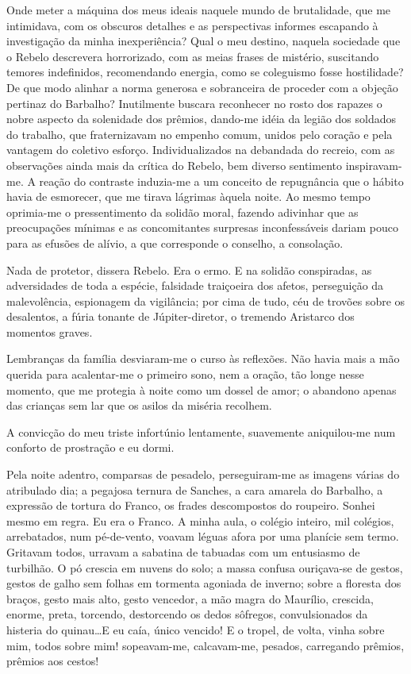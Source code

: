 Onde meter a máquina dos meus ideais naquele mundo de brutalidade, que me intimidava, 
com os obscuros detalhes e as perspectivas informes escapando à investigação da minha
inexperiência? Qual o meu destino, naquela sociedade que o Rebelo
descrevera horrorizado, com as meias frases de mistério, suscitando
temores indefinidos, recomendando energia, como se coleguismo fosse
hostilidade? De que modo alinhar a norma generosa e sobranceira de
proceder com a objeção pertinaz do Barbalho? Inutilmente buscara
reconhecer no rosto dos rapazes o nobre aspecto da solenidade dos
prêmios, dando{}-me idéia da legião dos soldados do trabalho, que
fraternizavam no empenho comum, unidos pelo coração e pela vantagem do
coletivo esforço. Individualizados na debandada do recreio, com as
observações ainda mais da crítica do Rebelo, bem diverso sentimento
inspiravam{}-me. A reação do contraste induzia{}-me a um conceito de
repugnância que o hábito havia de esmorecer, que me tirava lágrimas
àquela noite. Ao mesmo tempo oprimia{}-me o pressentimento da solidão
moral, fazendo adivinhar que as preocupações mínimas e as concomitantes
surpresas inconfessáveis dariam pouco para as efusões de alívio, a que
corresponde o conselho, a consolação. 

Nada de protetor, dissera Rebelo.
Era o ermo. E na solidão conspiradas, as adversidades de toda a
espécie, falsidade traiçoeira dos afetos, perseguição da malevolência,
espionagem da vigilância; por cima de tudo, céu de trovões sobre os
desalentos, a fúria tonante de Júpiter{}-diretor, o tremendo Aristarco
dos momentos graves. 

Lembranças da família desviaram{}-me o curso às
reflexões. Não havia mais a mão querida para acalentar{}-me o primeiro
sono, nem a oração, tão longe nesse momento, que me protegia à noite
como um dossel de amor; o abandono apenas das crianças sem lar que os
asilos da miséria recolhem. 

A convicção do meu triste infortúnio lentamente, suavemente 
aniquilou{}-me num conforto de prostração e eu dormi. 

Pela noite adentro, comparsas de pesadelo, perseguiram{}-me as
imagens várias do atribulado dia; a pegajosa ternura de Sanches, a cara
amarela do Barbalho, a expressão de tortura do Franco, os frades
descompostos do roupeiro. Sonhei mesmo em regra. Eu era o Franco. A
minha aula, o colégio inteiro, mil colégios, arrebatados, num
pé{}-de{}-vento, voavam léguas afora por uma planície sem termo.
Gritavam todos, urravam a sabatina de tabuadas com um entusiasmo de
turbilhão. O pó crescia em nuvens do solo; a massa confusa
ouriçava{}-se de gestos, gestos de galho sem folhas em tormenta
agoniada de inverno; sobre a floresta dos braços, gesto mais alto,
gesto vencedor, a mão magra do Maurílio, crescida, enorme, preta,
torcendo, destorcendo os dedos sôfregos, convulsionados da histeria do
quinau\ldots E eu caía, único vencido! E o tropel, de volta, vinha sobre
mim, todos sobre mim! sopeavam{}-me, calcavam{}-me, pesados, carregando
prêmios, prêmios aos cestos! 


